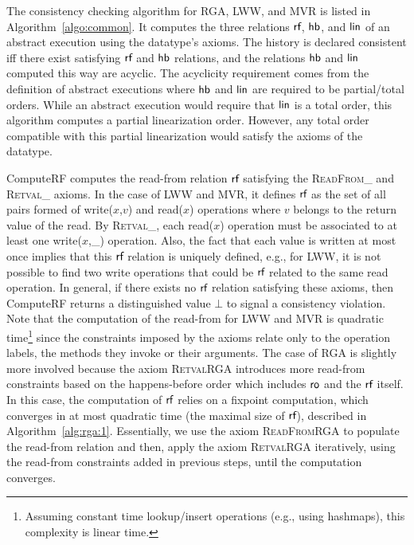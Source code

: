 The consistency checking algorithm for RGA, LWW, and MVR is listed in Algorithm~\ref{algo:common}. It computes the three relations $\textsf{rf}$, $\textsf{hb}$, and $\mathsf{lin}$ of an abstract execution using the datatype's axioms. The history is declared consistent iff there exist satisfying $\textsf{rf}$ and $\textsf{hb}$ relations, and the relations $\textsf{hb}$ and $\mathsf{lin}$ computed this way are acyclic. The acyclicity requirement comes from the definition of abstract executions where $\textsf{hb}$ and $\mathsf{lin}$ are required to be partial/total orders.
While an abstract execution would require that $\mathsf{lin}$ is a total order, this algorithm computes a partial linearization order. However, any total order compatible with this partial linearization would satisfy the axioms of the datatype.

\begin{algorithm}[t]
  {\footnotesize}
  \caption{The procedure {\sf ComputeRF} for RGA.}
  \label{alg:rga:1}
\end{algorithm}


{\sf ComputeRF} computes the read-from relation $\textsf{rf}$ satisfying the \textsc{ReadFrom\_} and \textsc{Retval\_} axioms. In the case of LWW and MVR, it defines $\textsf{rf}$ as the set of all pairs formed of {\sf write}($x$,$v$) and {\sf read}($x$) operations where $v$ belongs to the return value of the {\sf read}. By \textsc{Retval\_}, each {\sf read}($x$) operation must be associated to at least one {\sf write}($x$,\_) operation. Also, the fact that each value is written at most once implies that this $\textsf{rf}$ relation is uniquely defined, e.g., for LWW, it is not possible to find two {\sf write} operations that could be $\textsf{rf}$ related to the same {\sf read} operation. In general, if there exists no $\textsf{rf}$ relation satisfying these axioms, then {\sf ComputeRF} returns a distinguished value $\bot$ to signal a consistency violation. Note that the computation of the read-from for LWW and MVR is quadratic time\footnote{Assuming constant time lookup/insert operations (e.g., using hashmaps), this complexity is linear time.} since the constraints imposed by the axioms relate only to the operation labels, the methods they invoke or their arguments. The case of RGA is slightly more involved because the axiom \textsc{RetvalRGA} introduces more read-from constraints based on the happens-before order which includes $\mathsf{ro}$ and the $\textsf{rf}$ itself. In this case, the computation of $\textsf{rf}$ relies on a fixpoint computation, which converges in at most quadratic time (the maximal size of $\textsf{rf}$), described in Algorithm~\ref{alg:rga:1}. Essentially, we use the axiom \textsc{ReadFromRGA} to populate the read-from relation and then, apply the axiom \textsc{RetvalRGA} iteratively, using the read-from constraints added in previous steps, until the computation converges.

